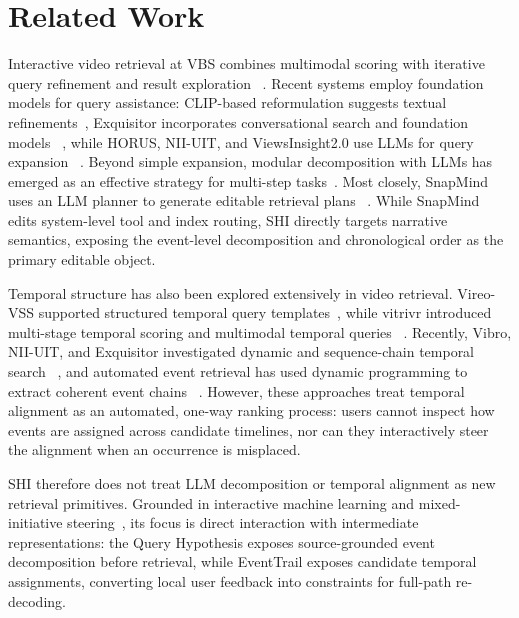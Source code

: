 \section{Related Work}

Interactive video retrieval at VBS combines multimodal scoring with iterative
query refinement and result exploration
~\cite{lokoc2021reign,schall2024interactive,jackl2026interaction}.
Recent systems employ foundation models for query assistance: CLIP-based
reformulation suggests textual refinements~\cite{lokoc2023queryreformulation},
Exquisitor incorporates conversational search and foundation models
~\cite{khan2024exquisitor,sharma2025exquisitor,sharma2025foundation}, while
HORUS, NII-UIT, and ViewsInsight2.0 use LLMs for query expansion
~\cite{nguyen2025horus,gia2025niiuit,vuong2025viewsinsight}.
Beyond simple expansion, modular decomposition with LLMs has emerged as an
effective strategy for multi-step tasks~\cite{khot2023decomposed}. Most closely,
SnapMind uses an LLM planner to generate editable retrieval plans
~\cite{hole2026snapmind}. While SnapMind edits system-level tool and index
routing, SHI directly targets narrative semantics, exposing the event-level
decomposition and chronological order as the primary editable object.

Temporal structure has also been explored extensively in video retrieval.
Vireo-VSS supported structured temporal query templates~\cite{wu2021sql}, while
vitrivr introduced multi-stage temporal scoring and multimodal temporal queries
~\cite{heller2020multistage,heller2022temporalqueries}. Recently, Vibro, NII-UIT,
and Exquisitor investigated dynamic and sequence-chain temporal search
~\cite{hezel2022vibro,gia2025niiuit,khan2026temporalqueries}, and automated
event retrieval has used dynamic programming to extract coherent event chains
~\cite{ho2026lucifertrace}. However, these approaches treat temporal alignment as
an automated, one-way ranking process: users cannot inspect how events are assigned
across candidate timelines, nor can they interactively steer the alignment when an
occurrence is misplaced.

SHI therefore does not treat LLM decomposition or temporal alignment as new
retrieval primitives. Grounded in interactive machine learning and mixed-initiative
steering~\cite{amershi2014power}, its focus is direct interaction with intermediate
representations: the Query Hypothesis exposes source-grounded event decomposition
before retrieval, while EventTrail exposes candidate temporal assignments,
converting local user feedback into constraints for full-path re-decoding.